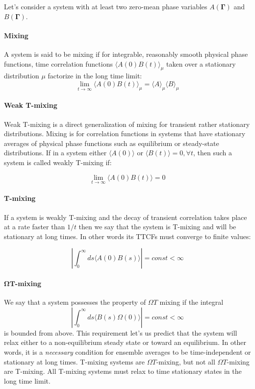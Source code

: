 \documentclass[a4paper,12pt]{article}
\begin{document}
Let's consider a system with at least two zero-mean phase variables $A(\bm{\Gamma})$ and $B(\bm{\Gamma})$. 

\paragraph{Mixing}

A system is said to be mixing if for integrable, reasonably smooth physical phase functions, time correlation functions $\langle A(0) B(t) \rangle_{\mu}$ taken over a stationary distribution $\mu$ factorize in the long time limit:
\begin{equation}
  \lim_{t \to \infty} \langle A(0) B(t)\rangle_{\mu} = \langle A \rangle_{\mu} \langle B \rangle_{\mu}  
\end{equation}

\paragraph{Weak T-mixing}

Weak T-mixing is a direct generalization of mixing for transient rather stationary distributions. Mixing is for correlation functions in systems that have stationary averages of physical phase functions such as equilibrium or steady-state distributions.
If in a system either $\langle A(0) \rangle $ or $ \langle B(t) \rangle = 0, \forall t $, then such a system is called weakly T-mixing if:

\begin{equation}
  \lim_{t \to \infty} \langle A(0) B(t) \rangle = 0
\end{equation}

\paragraph{T-mixing}
If a system is weakly T-mixing and the decay of transient correlation takes place at a rate faster than $1/t$ then we say that the system is T-mixing and will be stationary at long times. In other words its TTCFs must converge to finite values:

\begin{equation}
  \left| \int_0^{\infty} ds \langle A(0) B(s) \rangle \right| = const < \infty 
\end{equation}


\paragraph{$\bm{\Omega T}$-mixing}
We say that a system possesses the property of $\Omega T$ mixing if the integral
\begin{equation}
    \left| \int_0^{\infty} ds \langle B(s) \Omega(0) \rangle \right| = const < \infty
\end{equation}
is bounded from above. This requirement let's us predict that the system will relax either to a non-equilibrium steady state or toward an equilibrium. In other words, it is a \textit{necessary} condition for ensemble averages to be time-independent or stationary at long times.
T-mixing systems are $\Omega T$-mixing, but not all $\Omega T$-mixing are T-mixing. All T-mixing systems must relax to time stationary states in the long time limit.
\end{document}
